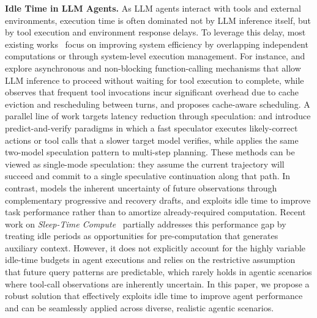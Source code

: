 \textbf{Idle Time in LLM Agents.}
As LLM agents interact with tools and external environments, execution time is often dominated not by LLM inference itself, but by tool execution and environment response delays.
To leverage this delay, most existing works~\cite{gim2024async1, li2025continuum, biswas2026sutradhara} focus on improving system efficiency by overlapping independent computations or through system-level execution management.
For instance, \citet{gim2024async1} and \citet{biswas2026sutradhara} explore asynchronous and non-blocking function-calling mechanisms that allow LLM inference to proceed without waiting for tool execution to complete, while \citet{li2025continuum} observes that frequent tool invocations incur significant overhead due to cache eviction and rescheduling between turns, and proposes cache-aware scheduling.
A parallel line of work targets latency reduction through speculation: \citet{ye2026speculative} and \citet{nichols2025optimizing} introduce predict-and-verify paradigms in which a fast speculator executes likely-correct actions or tool calls that a slower target model verifies, while \citet{hua2025interactive} applies the same two-model speculation pattern to multi-step planning.
These methods can be viewed as single-mode speculation: they assume the current trajectory will succeed and commit to a single speculative continuation along that path.
In contrast, \mname{} models the inherent uncertainty of future observations through complementary progressive and recovery drafts, and exploits idle time to improve task performance rather than to amortize already-required computation.
Recent work on \textit{Sleep-Time Compute}~\cite{lin2025sleeptime} partially addresses this performance gap by treating idle periods as opportunities for pre-computation that generates auxiliary context. However, it does not explicitly account for the highly variable idle-time budgets in agent executions and relies on the restrictive assumption that future query patterns are predictable, which rarely holds in agentic scenarios where tool-call observations are inherently uncertain.
In this paper, we propose a robust solution that effectively exploits idle time to improve agent performance and can be seamlessly applied across diverse, realistic agentic scenarios.


